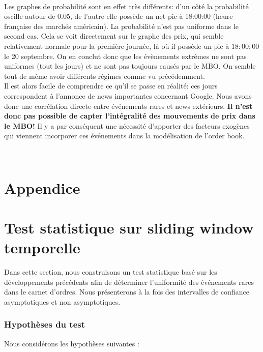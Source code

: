 \documentclass[12pt,a4paper]{article}
\theoremstyle{definition}
\theoremstyle{remark}
\begin{document}
\\

Les graphes de probabilité sont en effet très différents: d'un côté la probabilité oscille autour de 0.05, de l'autre elle possède un net pic à 18:00:00 (heure française des marchés américain). La probabilité n'est pas uniforme dans le second cas. Cela se voit directement sur le graphe des prix, qui semble relativement normale pour la première journée, là où il possède un pic à $18:00:00$ le 20 septembre. On en conclut donc que les évènements extrêmes ne sont pas uniformes (tout les jours) et ne sont pas toujours causés par le MBO. On semble tout de même avoir différents régimes comme vu précédemment.
\\

Il est alors facile de comprendre ce qu'il se passe en réalité: ces jours correspondent à l'annonce de news importantes concernant Google. Nous avons donc une corrélation directe entre événements rares et news extérieurs. \textbf{Il n'est donc pas possible de capter l'intégralité des mouvements de prix dans le MBO!} Il y a par conséquent une nécessité d'apporter des facteurs exogènes qui viennent incorporer ces événements dans la modélisation de l'order book.

\\ 
\clearpage








\section*{Appendice}
\section*{Test statistique sur sliding window temporelle}

Dans cette section, nous construisons un test statistique basé sur les développements précédents afin de déterminer l'uniformité des événements rares dans le carnet d'ordres. Nous présenterons à la fois des intervalles de confiance asymptotiques et non asymptotiques.

\subsubsection*{Hypothèses du test}

Nous considérons les hypothèses suivantes :
\end{document}
